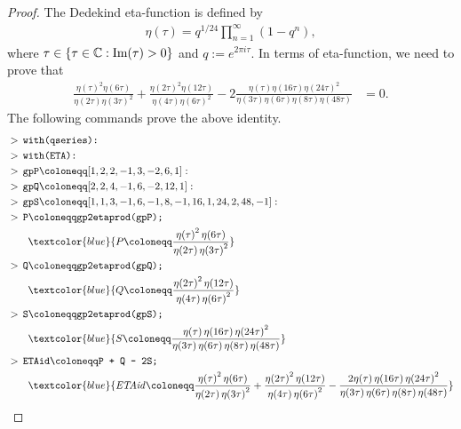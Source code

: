 \documentclass[12pt]{article}
\numberwithin{equation}{section}
\theoremstyle{plain}
\numberwithin{theorem}{section}
\theoremstyle{definition}
\theoremstyle{remark}
\begin{document}
\begin{proof}
The Dedekind eta-function is defined by
\begin{align*}
    \eta({\tau})=q^{1/24}\prod_{n=1}^\infty (1-q^n),
\end{align*}
where $\tau\in\{\tau\in\mathbb{C}: \textup{Im}(\tau)>0\}$ and $q:=e^{2\pi i \tau}$. In terms of eta-function, we need to prove that 
\begin{align*}
    \frac{\eta(\tau)^2 \eta(6\tau)}{\eta(2\tau) \eta(3\tau)^2}+\frac{\eta(2\tau)^2 \eta(12\tau)}{\eta(4\tau) \eta(6\tau)^2}-2 \frac{\eta(\tau) \eta(16\tau) \eta(24\tau)^2}{\eta(3\tau) \eta(6\tau) \eta(8\tau) \eta(48\tau)}&=0.
\end{align*}
The following commands prove the above identity.
\begin{align*}
    &>\,\texttt{with(qseries):}\\
    &>\,\texttt{with(ETA):}\\
    &>\, \texttt{gpP}\coloneqq [1, 2, 2, -1, 3, -2, 6, 1]:\\
    &>\, \texttt{gpQ}\coloneqq [2, 2, 4, -1, 6, -2, 12, 1]:\\
    &>\, \texttt{gpS}\coloneqq [1, 1, 3, -1, 6, -1, 8, -1, 16, 1, 24, 2, 48, -1]:\\
    &>\, \texttt{P}\coloneqq \texttt{gp2etaprod(gpP);}\\
    &\quad\quad \textcolor{blue}{ P\coloneqq \frac{\eta \! \left(\tau \right)^{2} \eta \! \left(6 \tau \right)}{\eta \! \left(2 \tau \right) \eta \! \left(3 \tau \right)^{2}}}\\
    &>\, \texttt{Q}\coloneqq \texttt{gp2etaprod(gpQ);}\\
    &\quad\quad \textcolor{blue}{ Q\coloneqq \frac{\eta \! \left(2 \tau \right)^{2} \eta \! \left(12 \tau \right)}{\eta \! \left(4 \tau \right) \eta \! \left(6 \tau \right)^{2}}}\\
     &>\, \texttt{S}\coloneqq \texttt{gp2etaprod(gpS);}\\
    &\quad\quad \textcolor{blue}{S\coloneqq \frac{\eta \! \left(\tau \right) \eta \! \left(16 \tau \right) \eta \! \left(24 \tau \right)^{2}}{\eta \! \left(3 \tau \right) \eta \! \left(6 \tau \right) \eta \! \left(8 \tau \right) \eta \! \left(48 \tau \right)}}\\
    &>\, \texttt{ETAid}\coloneqq \texttt{P + Q - 2S;}\\
    &\quad\quad \textcolor{blue}{\mathit{ETAid}\coloneqq \frac{\eta \! \left(\tau \right)^{2} \eta \! \left(6 \tau \right)}{\eta \! \left(2 \tau \right) \eta \! \left(3 \tau \right)^{2}}+\frac{\eta \! \left(2 \tau \right)^{2} \eta \! \left(12 \tau \right)}{\eta \! \left(4 \tau \right) \eta \! \left(6 \tau \right)^{2}}-\frac{2 \eta \! \left(\tau \right) \eta \! \left(16 \tau \right) \eta \! \left(24 \tau \right)^{2}}{\eta \! \left(3 \tau \right) \eta \! \left(6 \tau \right) \eta \! \left(8 \tau \right) \eta \! \left(48 \tau \right)}}\\

\end{align*}
\end{proof}
\end{document}

